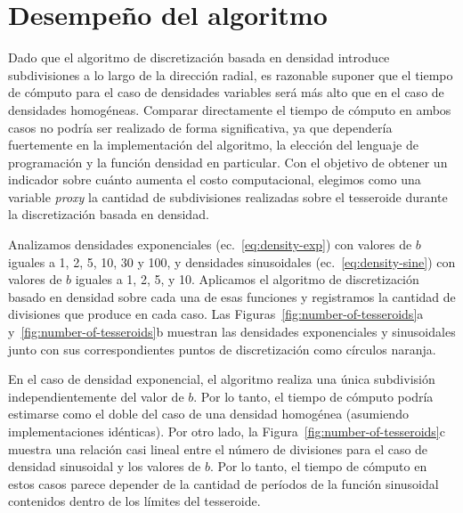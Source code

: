 
\section{Desempeño del algoritmo}

Dado que el algoritmo de discretización basada en densidad introduce
subdivisiones a lo largo de la dirección radial, es razonable suponer que el
tiempo de cómputo para el caso de densidades variables será más alto que en el
caso de densidades homogéneas.
Comparar directamente el tiempo de cómputo en ambos casos no podría ser
realizado de forma significativa, ya que dependería fuertemente en la
implementación del algoritmo, la elección del lenguaje de programación y la
función densidad en particular.
Con el objetivo de obtener un indicador sobre cuánto aumenta el costo
computacional, elegimos como una variable \emph{proxy} la cantidad de
subdivisiones realizadas sobre el tesseroide durante la discretización basada
en densidad.

Analizamos densidades exponenciales (ec.~\ref{eq:density-exp}) con valores de
$b$ iguales a 1, 2, 5, 10, 30 y 100, y densidades sinusoidales
(ec.~\ref{eq:density-sine}) con valores de $b$ iguales a 1, 2, 5, y 10.
Aplicamos el algoritmo de discretización basado en densidad sobre cada una de
esas funciones y registramos la cantidad de divisiones que produce en cada
caso.
Las Figuras~\ref{fig:number-of-tesseroids}a y~\ref{fig:number-of-tesseroids}b
muestran las densidades exponenciales y sinusoidales junto con sus
correspondientes puntos de discretización como círculos naranja.

En el caso de densidad exponencial, el algoritmo realiza una única subdivisión
independientemente del valor de $b$.
Por lo tanto, el tiempo de cómputo podría estimarse como el doble del caso de
una densidad homogénea (asumiendo implementaciones idénticas).
Por otro lado, la Figura~\ref{fig:number-of-tesseroids}c muestra una relación
casi lineal entre el número de divisiones para el caso de densidad sinusoidal
y los valores de $b$.
Por lo tanto, el tiempo de cómputo en estos casos parece depender de la
cantidad de períodos de la función sinusoidal contenidos dentro de los límites
del tesseroide.

